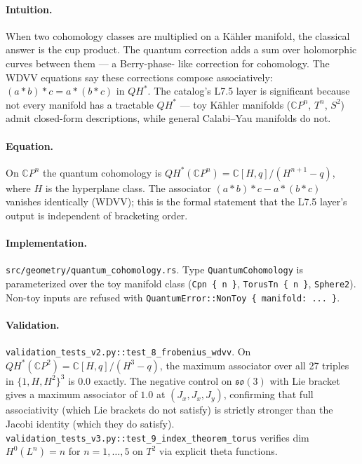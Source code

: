 \documentclass[11pt,letterpaper]{article}
\begin{document}
\paragraph{Intuition.}
When two cohomology classes are multiplied on a K\"ahler manifold,
the classical answer is the cup product. The quantum correction
adds a sum over holomorphic curves between them --- a Berry-phase-
like correction for cohomology. The WDVV equations say these
corrections compose associatively: $(a * b) * c = a * (b * c)$ in
$QH^*$. The catalog's L7.5 layer is significant because not every
manifold has a tractable $QH^*$ --- toy K\"ahler manifolds
($\mathbb{C}P^n$, $T^n$, $S^2$) admit closed-form descriptions,
while general Calabi--Yau manifolds do not.

\paragraph{Equation.}
On $\mathbb{C}P^n$ the quantum cohomology is
$QH^*(\mathbb{C}P^n) = \mathbb{C}[H, q] / (H^{n+1} - q)$,
where $H$ is the hyperplane class. The associator
$(a * b) * c - a * (b * c)$ vanishes identically (WDVV); this is
the formal statement that the L7.5 layer's output is independent
of bracketing order.

\paragraph{Implementation.}
\texttt{src/geometry/quantum\_cohomology.rs}.
Type \verb|QuantumCohomology| is parameterized over the toy
manifold class (\verb|Cpn { n }|, \verb|TorusTn { n }|,
\verb|Sphere2|). Non-toy inputs are refused with
\verb|QuantumError::NonToy { manifold: ... }|.

\paragraph{Validation.}
\texttt{validation\_tests\_v2.py::test\_8\_frobenius\_wdvv}. On
$QH^*(\mathbb{C}P^2) = \mathbb{C}[H, q] / (H^3 - q)$, the maximum
associator over all 27 triples in $\{1, H, H^2\}^3$ is $0.0$
exactly. The negative control on $\mathfrak{so}(3)$ with Lie
bracket gives a maximum associator of $1.0$ at $(J_x, J_x, J_y)$,
confirming that full associativity (which Lie brackets do not
satisfy) is strictly stronger than the Jacobi identity (which they
do satisfy). \texttt{validation\_tests\_v3.py::test\_9\_index\_theorem\_torus}
verifies dim $H^0(L^n) = n$ for $n = 1, \dots, 5$ on $T^2$ via
explicit theta functions.
\end{document}
